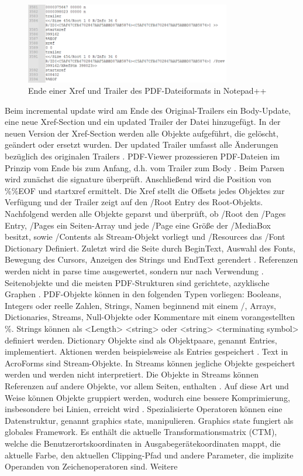 \begin{figure}[!htb]
	\centering
	\includegraphics[width=0.8\textwidth]{"images/pdf_trailer2-notepad.png"}
	\caption{Ende einer Xref und Trailer des PDF-Dateiformats in Notepad++}
	\label{fig:trailer2}
\end{figure}

Beim incremental update wird am Ende des Original-Trailers ein Body-Update, eine neue Xref-Section und ein updated Trailer der Datei hinzugefügt. In der neuen Version der Xref-Section werden alle Objekte aufgeführt, die gelöscht, geändert oder ersetzt wurden. Der updated Trailer umfasst alle Änderungen bezüglich des originalen Trailers \cite{schneeberger}. PDF-Viewer prozessieren PDF-Dateien im Prinzip vom Ende bis zum Anfang, d.h. vom Trailer zum Body \cite{ccc-break-pdf}. Beim Parsen wird zunächst die signature überprüft. Anschließend wird die Position von \%\%EOF und startxref ermittelt. Die Xref stellt die Offsets jedes Objektes zur Verfügung und der Trailer zeigt auf den /Root Entry des Root-Objekts. Nachfolgend werden alle Objekte geparst und überprüft, ob /Root den /Pages Entry, /Pages ein Seiten-Array und jede /Page eine Größe der /MediaBox besitzt, sowie /Contents als Stream-Objekt vorliegt und /Resources das /Font Dictionary Definiert. Zuletzt wird die Seite durch BeginText, Auswahl des Fonts, Bewegung des Cursors, Anzeigen des Strings und EndText gerendert \cite{ccc-pdf-secrets}. Referenzen werden nicht in parse time ausgewertet, sondern nur nach Verwendung \cite{ccc-wtf-pdf}. Seitenobjekte und die meisten PDF-Strukturen sind gerichtete, azyklische Graphen \cite{ccc-wtf-pdf}. PDF-Objekte können in den folgenden Typen vorliegen: Booleans, Integers oder reelle Zahlen, Strings, Namen beginnend mit einem /, Arrays, Dictionaries, Streams, Null-Objekte oder Kommentare mit einem vorangestellten \%. Strings können als <Length> <string> oder <string> <terminating symbol> definiert werden. Dictionary Objekte sind als Objektpaare, genannt Entries, implementiert. Aktionen werden beispielsweise als Entries gespeichert \cite{ccc-badpdf}. Text in AcroForms sind Stream-Objekte. In Streams können jegliche Objekte gespeichert werden und werden nicht interpretiert. Die Objekte in Streams können Referenzen auf andere Objekte, vor allem Seiten, enthalten \cite{ccc-break-pdf}. Auf diese Art und Weise können Objekte gruppiert werden, wodurch eine bessere Komprimierung, insbesondere bei Linien, erreicht wird \cite{schneeberger}. Spezialisierte Operatoren können eine Datenstruktur, genannt graphics state, manipulieren. Graphics state fungiert als globales Framework. Es enthält die aktuelle Transformationsmatrix (CTM), welche die Benutzerortskoordinaten in Ausgabegerätekoordinaten mappt, die aktuelle Farbe, den aktuellen Clipping-Pfad und andere Parameter, die implizite Operanden von Zeichenoperatoren sind. Weitere 